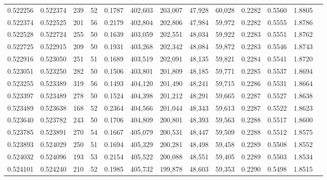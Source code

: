 \begin{tabular}{rrrrrrrrrrrrr}
0.522256 & 0.522374 &   239 &  52 &                                     0.1787 & 402,603 & 203,007 &  47,928 &  60,028 & 0.2282 & 0.5560 & 1.8805 \\
0.522374 & 0.522525 &   201 &  56 &                                     0.2179 & 402,804 & 202,806 &  47,984 &  59,972 & 0.2282 & 0.5555 & 1.8786 \\
0.522528 & 0.522724 &   255 &  50 &                                     0.1639 & 403,059 & 202,551 &  48,034 &  59,922 & 0.2283 & 0.5551 & 1.8762 \\
0.522725 & 0.522915 &   209 &  50 &                                     0.1931 & 403,268 & 202,342 &  48,084 &  59,872 & 0.2283 & 0.5546 & 1.8743 \\
0.522916 & 0.523050 &   251 &  51 &                                     0.1689 & 403,519 & 202,091 &  48,135 &  59,821 & 0.2284 & 0.5541 & 1.8720 \\
0.523051 & 0.523250 &   282 &  50 &                                     0.1506 & 403,801 & 201,809 &  48,185 &  59,771 & 0.2285 & 0.5537 & 1.8694 \\
0.523255 & 0.523389 &   319 &  56 &                                     0.1493 & 404,120 & 201,490 &  48,241 &  59,715 & 0.2286 & 0.5531 & 1.8664 \\
0.523397 & 0.523489 &   278 &  50 &                                     0.1524 & 404,398 & 201,212 &  48,291 &  59,665 & 0.2287 & 0.5527 & 1.8638 \\
0.523489 & 0.523638 &   168 &  52 &                                     0.2364 & 404,566 & 201,044 &  48,343 &  59,613 & 0.2287 & 0.5522 & 1.8623 \\
0.523640 & 0.523782 &   243 &  50 &                                     0.1706 & 404,809 & 200,801 &  48,393 &  59,563 & 0.2288 & 0.5517 & 1.8600 \\
0.523785 & 0.523891 &   270 &  54 &                                     0.1667 & 405,079 & 200,531 &  48,447 &  59,509 & 0.2288 & 0.5512 & 1.8575 \\
0.523893 & 0.524029 &   250 &  51 &                                     0.1694 & 405,329 & 200,281 &  48,498 &  59,458 & 0.2289 & 0.5508 & 1.8552 \\
0.524032 & 0.524096 &   193 &  53 &                                     0.2154 & 405,522 & 200,088 &  48,551 &  59,405 & 0.2289 & 0.5503 & 1.8534 \\
0.524101 & 0.524240 &   210 &  52 &                                     0.1985 & 405,732 & 199,878 &  48,603 &  59,353 & 0.2290 & 0.5498 & 1.8515 \\

\end{tabular}
